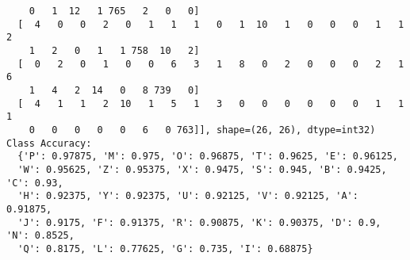 \documentclass[12pt, titlepage]{article}
\begin{document}
\begin{verbatim}
    0   1  12   1 765   2   0   0]
  [  4   0   0   2   0   1   1   1   0   1  10   1   0   0   0   1   1   2
    1   2   0   1   1 758  10   2]
  [  0   2   0   1   0   0   6   3   1   8   0   2   0   0   0   2   1   6
    1   4   2  14   0   8 739   0]
  [  4   1   1   2  10   1   5   1   3   0   0   0   0   0   0   1   1   1
    0   0   0   0   0   6   0 763]], shape=(26, 26), dtype=int32)
Class Accuracy:
  {'P': 0.97875, 'M': 0.975, 'O': 0.96875, 'T': 0.9625, 'E': 0.96125,
  'W': 0.95625, 'Z': 0.95375, 'X': 0.9475, 'S': 0.945, 'B': 0.9425, 'C': 0.93,
  'H': 0.92375, 'Y': 0.92375, 'U': 0.92125, 'V': 0.92125, 'A': 0.91875,
  'J': 0.9175, 'F': 0.91375, 'R': 0.90875, 'K': 0.90375, 'D': 0.9, 'N': 0.8525,
  'Q': 0.8175, 'L': 0.77625, 'G': 0.735, 'I': 0.68875}
\end{verbatim}
\end{document}
